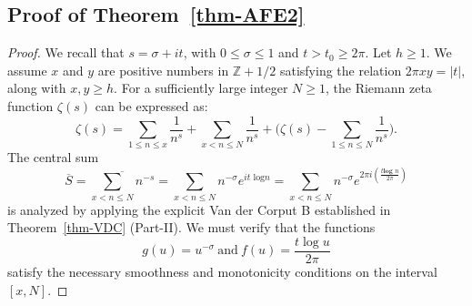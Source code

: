 \documentclass[11pt,letterpaper,oneside,reqno]{amsart}
\renewcommand{\^}[1]{\widehat{#1}}
\newcommand{\s}{\sigma}
\numberwithin{equation}{section}
\theoremstyle{remark}
\newcommand*{\thmref}[1]{Theorem~\ref{#1}}
\begin{document}
\subsection{Proof of \thmref{thm-AFE2}}\begin{proof}
 We recall that $s = \sigma + it$, with $0 \leq \sigma \leq 1$ and $t > t_0  \geq 2\pi$. 
 Let $h \geq 1$.
 We assume $x$ and $y$ are positive numbers in $\mathbb{Z}+1/2$ satisfying the relation $2\pi xy = |t|$, along with $x, y \geq h$. 
For a sufficiently large integer $N \geq 1$, the Riemann zeta function $\zeta(s)$ can be expressed as:
\begin{equation}\zeta(s) = \sum_{1 \leq n \leq x} \frac{1}{n^s} + \sum_{x < n \leq N} \frac{1}{n^s} + \bigg( \zeta(s) - \sum_{1 \leq n \leq N} \frac{1}{n^s} \bigg) .\label{eq:zeta_split}
\end{equation}
%
The central sum \begin{equation}
\overline{S}=\overline{\sum_{x < n \leq N} n^{-s}}=\sum_{x < n \leq N} n^{-\s}e^{it \text{ log}n}=\sum_{x<n\leq N} n^{-\s}e^{2\pi i (\frac{t \textbf{log }n}{2 \pi})} \label{S.1}
\end{equation}
is analyzed by applying the explicit Van der Corput B established in \thmref{thm-VDC} (Part-II).
We must verify that the functions 
   \[
g(u) = u^{-\sigma} \ \text{and}\ 
f(u) = \frac{t \log u}{2\pi} 
   \]     
satisfy the necessary smoothness and monotonicity conditions on the interval $[x, N]$. 
\smallskip


\end{proof}
\end{document}
